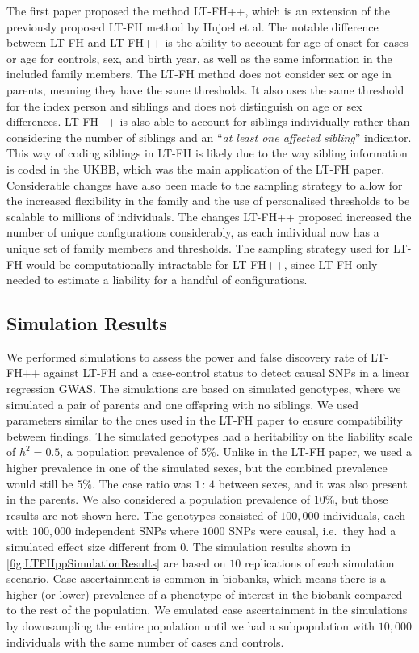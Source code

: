 The first paper proposed the method LT-FH++, which is an extension of the previously proposed LT-FH method by Hujoel et al\cite{hujoel2020liability}. The notable difference between LT-FH and LT-FH++ is the ability to account for age-of-onset for cases or age for controls, sex, and birth year, as well as the same information in the included family members. The LT-FH method does not consider sex or age in parents, meaning they have the same thresholds. It also uses the same threshold for the index person and siblings and does not distinguish on age or sex differences. LT-FH++ is also able to account for siblings individually rather than considering the number of siblings and an \enquote{\textit{at least one affected sibling}} indicator. This way of coding siblings in LT-FH is likely due to the way sibling information is coded in the UKBB, which was the main application of the LT-FH paper. Considerable changes have also been made to the sampling strategy to allow for the increased flexibility in the family and the use of personalised thresholds to be scalable to millions of individuals.  The changes LT-FH++ proposed increased the number of unique configurations considerably, as each individual now has a unique set of family members and thresholds. The sampling strategy used for LT-FH would be computationally intractable for LT-FH++, since LT-FH only needed to estimate a liability for a handful of configurations.


\subsection{Simulation Results}
We performed simulations to assess the power and false discovery rate of LT-FH++ against LT-FH and a case-control status to detect causal SNPs in a linear regression GWAS. The simulations are based on simulated genotypes, where we simulated a pair of parents and one offspring with no siblings. We used parameters similar to the ones used in the LT-FH paper to ensure compatibility between findings. The simulated genotypes had a heritability on the liability scale of $ h^2 = 0.5 $, a population prevalence of $ 5\% $. Unlike in the LT-FH paper, we used a higher prevalence in one of the simulated sexes, but the combined prevalence would still be $ 5\% $. The case ratio was $ 1{\,:\,}4 $ between sexes, and it was also present in the parents. We also considered a population prevalence of $ 10\% $, but those results are not shown here. The genotypes consisted of $ 100,000 $ individuals, each with $ 100,000 $ independent SNPs where $ 1000 $ SNPs were causal, i.e.\ they had a simulated effect size different from $ 0 $. The simulation results shown in \cref{fig:LTFHppSimulationResults} are based on $ 10 $ replications of each simulation scenario. Case ascertainment is common in biobanks, which means there is a higher (or lower) prevalence of a phenotype of interest in the biobank compared to the rest of the population. We emulated case ascertainment in the simulations by downsampling the entire population until we had a subpopulation with $ 10,000 $ individuals with the same number of cases and controls.

